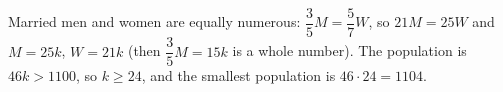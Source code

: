 Married men and women are equally numerous: $\dfrac{3}{5}M=\dfrac{5}{7}W$, so $21M=25W$ and $M=25k$, $W=21k$ (then $\dfrac{3}{5}M=15k$ is a whole number). The population is $46k>1100$, so $k\ge24$, and the smallest population is $46\cdot24=\boxed{1104}$.

